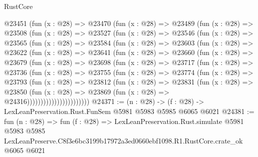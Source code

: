\begin{lexlean}{RustCore}
\begin{coremodule}
  @23451
    (fun (x : @28) =>
    @23470
      (fun (x : @28) =>
      @23489
        (fun (x : @28) =>
        @23508
          (fun (x : @28) =>
          @23527
            (fun (x : @28) =>
            @23546
              (fun (x : @28) =>
              @23565
                (fun (x : @28) =>
                @23584
                  (fun (x : @28) =>
                  @23603
                    (fun (x : @28) =>
                    @23622
                      (fun (x : @28) =>
                      @23641
                        (fun (x : @28) =>
                        @23660
                          (fun (x : @28) =>
                          @23679
                            (fun (x : @28) =>
                            @23698
                              (fun (x : @28) =>
                              @23717
                                (fun (x : @28) =>
                                @23736
                                  (fun (x : @28) =>
                                  @23755
                                    (fun (x : @28) =>
                                    @23774
                                      (fun (x : @28) =>
                                      @23793
                                        (fun (x : @28) =>
                                        @23812
                                          (fun (x : @28) =>
                                          @23831
                                            (fun (x : @28) =>
                                            @23850
                                              (fun (x : @28) =>
                                              @23869 (fun (x : @28) => @24316)))))))))))))))))))))))
@24371 := (n : @28) -> (f : @28) -> LexLeanPreservation.Rust.FunSem @5981 @5983 @5985 @6065 @6021
@24381 := fun (n : @28) =>
  fun (f : @28) =>
  LexLeanPreservation.Rust.simulate
    @5981
    @5983
    @5985
    LexLeanPreserve.C8f3e6bc3199b17972a3ed0660ebf1098.R1.RustCore.crate_ok
    @6065
    @6021
\end{coremodule}
\end{lexlean}

